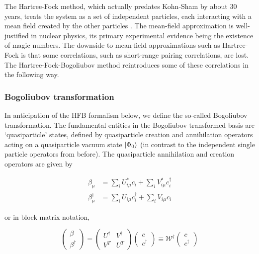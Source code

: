 The Hartree-Fock method, which actually predates Kohn-Sham by about 30 years, treats the system as a set of independent particles, each interacting with a mean field created by the other particles \cite{ring1980}. The mean-field approximation is well-justified in nuclear physics, its primary experimental evidence being the existence of magic numbers. The downside to mean-field approximations such as Hartree-Fock is that some correlations, such as short-range pairing correlations, are lost. The Hartree-Fock-Bogoliubov method reintroduces some of these correlations in the following way.

\subsubsection{Bogoliubov transformation}

In anticipation of the HFB formalism below, we define the so-called Bogoliubov transformation. The fundamental entities in the Bogoliubov transformed basis are `quasiparticle' states, defined by quasiparticle creation and annihilation operators acting on a quasiparticle vacuum state $\ket{\Phi_0}$ (in contrast to the independent single particle operators from before). The quasiparticle annihilation and creation operators are given by

\begin{align}
\beta_\mu &= \sum_i U^*_{i\mu}c_i + \sum_i V^*_{i\mu}c_i^\dagger \\
\beta_\mu^\dagger &= \sum_i U_{i\mu}c_i^\dagger + \sum_i V_{i\mu}c_i
\end{align}

\noindent or in block matrix notation,

\begin{equation}
\left(\begin{array}{c} \beta \\ \beta^\dagger\end{array}\right) = 
\left(\begin{array}{cc} U^\dagger & V^\dagger \\ V^T & U^T \end{array}\right)
\left(\begin{array}{c} c \\ c^\dagger\end{array}\right)
\equiv \mathcal{W}^\dagger \left(\begin{array}{c} c \\ c^\dagger\end{array}\right)
\end{equation}

